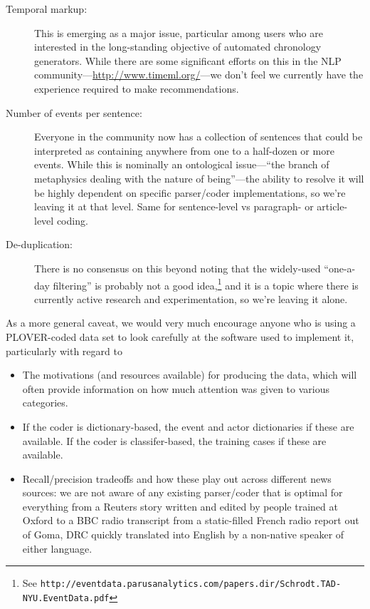 \documentclass[11pt]{report}
\newcommand{\fn}[1]{\footnote{#1}}
\begin{document}
\begin{description}
\item[Temporal markup:] This is emerging as a major issue, particular among users who are interested in the long-standing objective of automated chronology generators. While there are some significant efforts on this in the NLP community---\url{http://www.timeml.org/}---we don't feel we currently have the experience required to make recommendations.
\item[Number of events per sentence:] Everyone in the community now has a collection of sentences that could be interpreted as containing anywhere from one to a half-dozen or more events. While this is nominally an ontological issue---``the branch of metaphysics dealing with the nature of being''---the ability to resolve it will be highly dependent on specific parser/coder implementations, so we're leaving it at that level. Same for sentence-level vs paragraph- or article-level coding.
\item[De-duplication:] There is no consensus on this beyond noting that the widely-used ``one-a-day filtering'' is probably not a good idea,\fn{See \texttt{http://eventdata.parusanalytics.com/papers.dir/Schrodt.TAD-NYU.EventData.pdf}} and it is a topic where there is currently active research and experimentation, so we're leaving it alone.
\end{description}

As a more general caveat, we would very much encourage anyone who is using a PLOVER-coded data set to look carefully at the software used to implement it, particularly with regard to
\begin{itemize}
\item The motivations (and resources available) for producing the data, which will often provide information on how much attention was given to various categories. 
\item If the coder is dictionary-based, the event and actor dictionaries if these are available. If the coder is classifer-based, the training cases if these are available.
\item Recall/precision tradeoffs and how these play out across different news sources: we are not aware of any existing parser/coder that is optimal for everything from a Reuters story written and edited by people trained at Oxford to a BBC radio transcript from a static-filled French radio report out of Goma, DRC quickly translated into English by a non-native speaker of either language.
\end{itemize}
\end{document}
